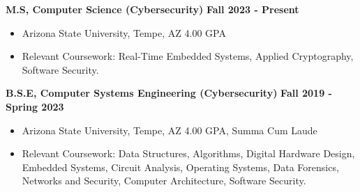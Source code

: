 \textbf{M.S, Computer Science (Cybersecurity)} \hfill \textbf{Fall 2023 - Present}
\begin{itemize}
    \setlength{\itemsep}{0pt} %
    \setlength{\parskip}{0pt} %
    \item{Arizona State University, Tempe, AZ \hfill 4.00 GPA}
    \item{Relevant Coursework: Real-Time Embedded Systems, Applied Cryptography, Software Security.}
\end{itemize}

\vspace{0.3em}

\textbf{B.S.E, Computer Systems Engineering (Cybersecurity)} \hfill \textbf{Fall 2019 - Spring 2023}
\begin{itemize}
    \setlength{\itemsep}{0pt} %
    \setlength{\parskip}{0pt} %
    \item{Arizona State University, Tempe, AZ \hfill 4.00 GPA, Summa Cum Laude}
    \item{Relevant Coursework: Data Structures, Algorithms, Digital Hardware Design, Embedded Systems, Circuit Analysis, Operating Systems, Data Forensics, Networks and Security, Computer Architecture, Software Security.}
\end{itemize}

